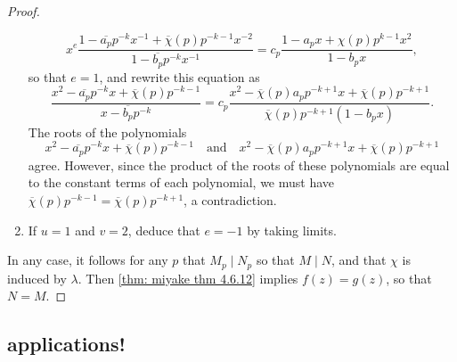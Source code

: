 \documentclass[10pt,leqno,twoside,b5paper]{article}
\theoremstyle{plain}
\theoremstyle{definition}
\numberwithin{equation}{section}
\numberwithin{lem}{section}
\newcommand{\sai}[1]{\textcolor{red}{#1}}
\begin{document}
\begin{proof}
\begin{enumerate}[label=(\arabic*)]
        \[x^e\frac{1-\overline{a_p}p^{-k}x^{-1} + \overline{\chi}(p)p^{-k-1}x^{-2}}{1-\overline{b_p}p^{-k}x^{-1}} = c_p\frac{1-a_px + \chi(p)p^{k-1}x^2}{1-b_px},\] so that $e = 1$, and rewrite this equation as 
        \[\frac{x^2-\overline{a_p}p^{-k}x + \overline \chi(p)p^{-k-1}}{x-\overline{b_p}p^{-k}} = c_p\frac{x^2-\overline\chi(p)a_pp^{-k+1}x + \overline\chi(p)p^{-k+1}}{\overline\chi(p)p^{-k+1}(1-b_px)}.\] The roots of the polynomials 
        \[x^2-\overline{a_p}p^{-k}x + \overline \chi(p)p^{-k-1}\quad \text{and}\quad x^2-\overline\chi(p)a_pp^{-k+1}x + \overline\chi(p)p^{-k+1}\] agree. However, since the product of the roots of these polynomials are equal to the constant terms of each polynomial, we must have $\overline \chi(p)p^{-k-1} = \overline\chi(p)p^{-k+1}$, a contradiction. 
        
        \item If $u = 1$ and $v = 2$, deduce that $e = -1$ by taking limits.
    \end{enumerate}
    In any case, it follows for any $p$ that $M_p\mid N_p$ so that $M\mid N$, and that $\chi$ is induced by $\lambda$. Then \cref{thm: miyake thm 4.6.12} implies $f(z) = g(z)$, so that $N = M$.
\end{proof}
\subsection{applications!}

\end{document}
